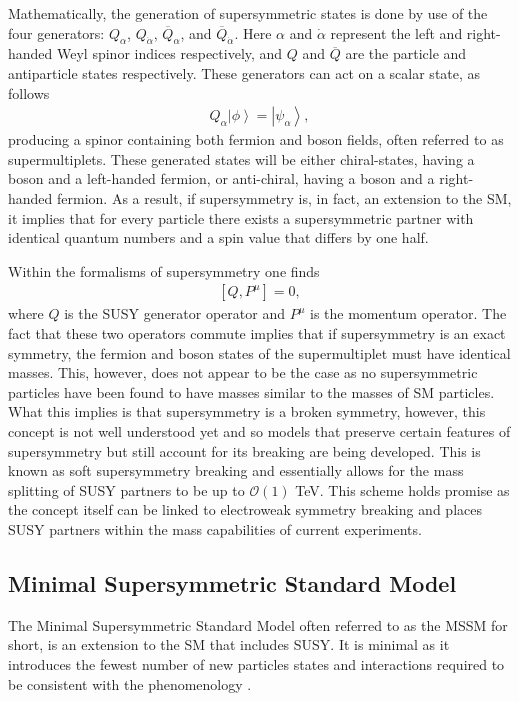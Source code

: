 Mathematically, the generation of supersymmetric states is done by use of the four generators: $Q_{\alpha}$, $Q_{\dot{\alpha}}$, $\overline{Q}_{\alpha}$, and $\overline{Q}_{\dot{\alpha}}$. 
Here $\alpha$ and $\dot{\alpha}$ represent the left and right-handed Weyl spinor indices respectively, and $Q$ and $\overline{Q}$ are the particle and antiparticle states respectively.
These generators can act on a scalar state, as follows
\begin{align}
Q_{\alpha} \left| \phi \right> = \left|\psi_{\alpha}\right>,
\end{align}
producing a spinor containing both fermion and boson fields, often referred to as supermultiplets. 
These generated states will be either chiral-states, having a boson and a left-handed fermion, or anti-chiral, having a boson and a right-handed fermion.
As a result, if supersymmetry is, in fact, an extension to the SM, it implies that for every particle there exists a supersymmetric partner with identical quantum numbers and a spin value that differs by one half.

Within the formalisms of supersymmetry one finds 
\begin{align}
\left[Q, P^{\mu} \right] = 0,
\end{align}
where $Q$ is the SUSY generator operator and $P^{\mu}$ is the momentum operator.
The fact that these two operators commute implies that if supersymmetry is an exact symmetry, the fermion and boson states of the supermultiplet must have identical masses.
This, however, does not appear to be the case as no supersymmetric particles have been found to have masses similar to the masses of SM particles.
What this implies is that supersymmetry is a broken symmetry, however, this concept is not well understood yet and so models that preserve certain features of supersymmetry but still account for its breaking are being developed. 
This is known as soft supersymmetry breaking and essentially allows for the mass splitting of SUSY partners to be up to $\mathcal{O}(1)$ TeV.
This scheme holds promise as the concept itself can be linked to electroweak symmetry breaking \cite{chung2005soft} and places SUSY partners within the mass capabilities of current experiments.

\subsection{Minimal Supersymmetric Standard Model} 
The Minimal Supersymmetric Standard Model often referred to as the MSSM for short, is an extension to the SM that includes SUSY. 
It is minimal as it introduces the fewest number of new particles states and interactions required to be consistent with the phenomenology \cite{baer2006weak}.


